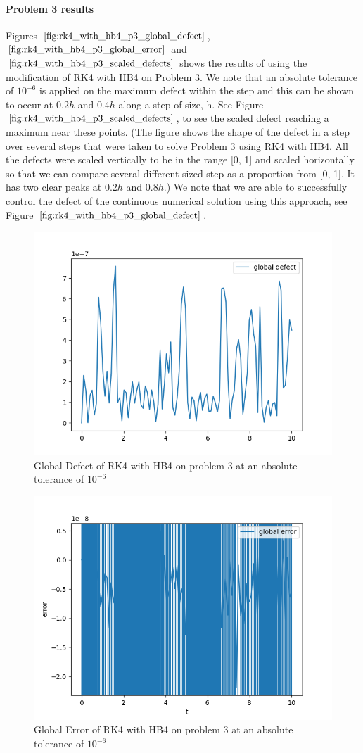 \documentclass{article}
\begin{document}
\paragraph{Problem 3 results}
Figures $\ref{fig:rk4_with_hb4_p3_global_defect}$, $\ref{fig:rk4_with_hb4_p3_global_error}$ and $\ref{fig:rk4_with_hb4_p3_scaled_defects}$ shows the results of using the modification of RK4 with HB4 on Problem 3. We note that an absolute tolerance of $10^{-6}$ is applied on the maximum defect within the step and this can be shown to occur at $0.2h$ and $0.4h$ along a step of size, h. See Figure $\ref{fig:rk4_with_hb4_p3_scaled_defects}$, to see the scaled defect reaching a maximum near these points. (The figure shows the shape of the defect in a step over several steps that were taken to solve Problem 3 using RK4 with HB4. All the defects were scaled vertically to be in the range [0, 1] and scaled horizontally so that we can compare several different-sized step as a proportion from [0, 1]. It has two clear peaks at $0.2h$ and $0.8h$.) We note that we are able to successfully control the defect of the continuous numerical solution using this approach, see Figure $\ref{fig:rk4_with_hb4_p3_global_defect}$. 

\begin{figure}[H]
\centering
\includegraphics[width=0.7\linewidth]{./figures/rk4_with_hb4_p3_global_defect}
\caption{Global Defect of RK4 with HB4 on problem 3 at an absolute tolerance of $10^{-6}$}
\label{fig:rk4_with_hb4_p3_global_defect}
\end{figure}

\begin{figure}[H]
\centering
\includegraphics[width=0.7\linewidth]{./figures/rk4_with_hb4_p3_global_error}
\caption{Global Error of RK4 with HB4 on problem 3 at an absolute tolerance of $10^{-6}$}
\label{fig:rk4_with_hb4_p3_global_error}
\end{figure}
\end{document}
